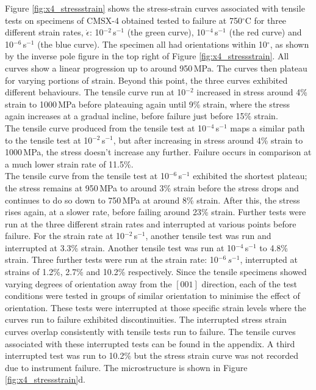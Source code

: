 \documentclass[a4paper,12pt,times,numbered,print,index]{Classes/PhDThesisPSnPDF}
\begin{document}
Figure \ref{fig:x4_stressstrain} shows the stress-strain curves associated with tensile tests on specimens of CMSX-4 obtained tested to failure at 750$^{\circ}$C for three different strain rates,  $\dot{\epsilon}$: 10$^{-2}$\,s$^{-1}$ (the green curve), 10$^{-4}$\,s$^{-1}$ (the red curve) and 10$^{-6}$\,s$^{-1}$ (the blue curve). The specimen all had orientations within 10$^\circ$, as shown by the inverse pole figure in the top right of Figure \ref{fig:x4_stressstrain}. All curves show a linear progression up to around 950\,MPa. The curves then plateau for varying portions of strain. Beyond this point, the three curves exhibited different behaviours. The tensile curve run at 10$^{-2}$ increased in stress around 4\% strain to 1000\,MPa before plateauing again until 9\% strain, where the stress again increases at a gradual incline, before failure just before 15\% strain.\\
The tensile curve produced from the tensile test at 10$^{-4}$\,s$^{-1}$ maps a similar path to the tensile test at 10$^{-2}$\,s$^{-1}$, but after increasing in stress around 4\% strain to 1000\,MPa, the stress doesn't increase any further. Failure occurs in comparison at a much lower strain rate of 11.5\%.\\
The tensile curve from the tensile test at 10$^{-6}$\,s$^{-1}$ exhibited the shortest plateau; the stress remains at 950\,MPa to around 3\% strain before the stress drops and continues to do so down to 750\,MPa at around 8\% strain. After this, the stress rises again, at a slower rate, before failing around 23\% strain.
Further tests were run at the three different strain rates and interrupted at various points before failure. For the strain rate at 10$^{-2}$\,s$^{-1}$, another tensile test was run and interrupted at 3.3\% strain. Another tensile test was run at 10$^{-4}$\,s$^{-1}$ to 4.8\% strain. Three further tests were run at the  strain rate: 10$^{-6}\,s^{-1}$, interrupted at strains of  1.2\%, 2.7\% and 10.2\% respectively.
Since the tensile specimens showed varying degrees of orientation away from the $[001]$ direction, each of the test conditions were tested in groups of similar orientation to minimise the effect of orientation. These tests were interrupted at those specific strain levels where the curves run to failure exhibited discontinuities. The interrupted stress strain curves overlap consistently with tensile tests run to failure. The tensile curves associated with these interrupted tests can be found in the appendix. A third interrupted test was run to 10.2\% but the stress strain curve was not recorded due to instrument failure. The microstructure is shown in Figure \ref{fig:x4_stressstrain}d.\\
\end{document}
